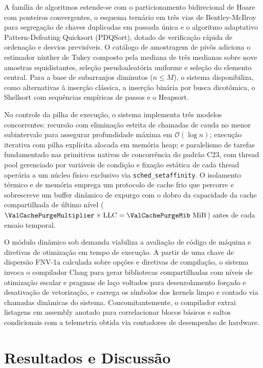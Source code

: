 \documentclass[12pt]{article}
\begin{document}
A família de algoritmos estende-se com o particionamento bidirecional de Hoare com ponteiros convergentes, o esquema ternário em três vias de Bentley-McIlroy para segregação de chaves duplicadas em passada única e o algoritmo adaptativo Pattern-Defeating Quicksort (PDQSort), dotado de verificação rápida de ordenação e desvios previsíveis. O catálogo de amostragem de pivôs adiciona o estimador ninther de Tukey composto pela mediana de três medianas sobre nove amostras equidistantes, seleção pseudoaleatória uniforme e seleção do elemento central. Para a base de subarranjos diminutos ($n \le M$), o sistema disponibiliza, como alternativas à inserção clássica, a inserção binária por busca dicotômica, o Shellsort com sequências empíricas de passos e o Heapsort.

No controle da pilha de execução, o sistema implementa três modelos concorrentes: recursão com eliminação estrita de chamadas de cauda no menor subintervalo para assegurar profundidade máxima em $\mathcal{O}(\log n)$; execução iterativa com pilha explícita alocada em memória heap; e paralelismo de tarefas fundamentado nas primitivas nativas de concorrência do padrão C23, com thread pool gerenciado por variáveis de condição e fixação estática de cada thread operária a um núcleo físico exclusivo via \texttt{sched\_setaffinity}. O isolamento térmico e de memória emprega um protocolo de cache frio que percorre e sobrescreve um buffer dinâmico de expurgo com o dobro da capacidade da cache compartilhada de último nível ($\ValCachePurgeMultiplier\times\text{LLC} = \ValCachePurgeMib\text{ MiB}$) antes de cada ensaio temporal.

O módulo dinâmico sob demanda viabiliza a avaliação de código de máquina e diretivas de otimização em tempo de execução. A partir de uma chave de dispersão FNV-1a calculada sobre opções e diretivas de compilação, o sistema invoca o compilador Clang para gerar bibliotecas compartilhadas com níveis de otimização escalar e pragmas de laço voltados para desenrolamento forçado e desativação de vetorização, e carrega os símbolos dos kernels limpo e contado via chamadas dinâmicas do sistema. Concomitantemente, o compilador extrai listagens em assembly anotado para correlacionar blocos básicos e saltos condicionais com a telemetria obtida via contadores de desempenho de hardware.

\section{Resultados e Discussão}\label{sec:resultados}
\end{document}

